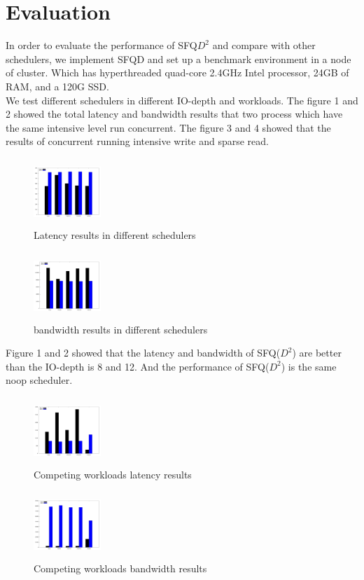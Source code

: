 \section{Evaluation}
In order to evaluate the performance of SFQ$D^2$ and compare with other schedulers, 
we implement SFQD and set up a benchmark environment in a node of cluster. Which has
hyperthreaded quad-core 2.4GHz Intel processor, 24GB of RAM, and a 120G SSD.\\
We test different schedulers in different IO-depth and workloads. The figure 1 and 2
showed the total latency and bandwidth results that two process which have the same
intensive level run concurrent. The figure 3 and 4 showed that the results of concurrent
running intensive write and sparse read.\\

\begin{figure}[h!]
	\includegraphics[width=1in,height=1in]{./image/lat_same}
	\centering
	\caption{Latency results in different schedulers}
\end{figure}
\begin{figure}[h!]
	\includegraphics[width=1in,height=1in]{./image/bw_same}
	\centering
	\caption{bandwidth results in different schedulers}
\end{figure}

Figure 1 and 2 showed that the latency and bandwidth of SFQ($D^2$) are better than
the IO-depth is 8 and 12. And the performance of SFQ($D^2$) is the same noop scheduler.\\


\begin{figure}[h!]
	\includegraphics[width=1in,height=1in]{./image/lat_sparse}
	\centering
	\caption{Competing workloads latency results}
\end{figure}
\begin{figure}[h!]
	\includegraphics[width=1in,height=1in]{./image/bw_sparse}
	\centering
	\caption{Competing workloads bandwidth results}
\end{figure}

